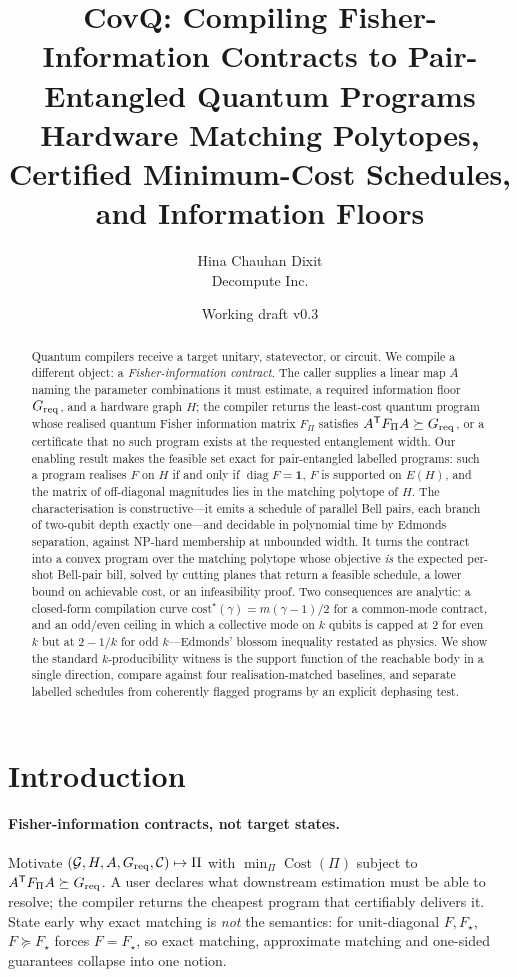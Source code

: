 \documentclass[11pt]{article}
\title{CovQ: Compiling Fisher-Information Contracts to Pair-Entangled Quantum
Programs\\\large Hardware Matching Polytopes, Certified Minimum-Cost Schedules, and
Information Floors}
\author{Hina Chauhan Dixit\\Decompute Inc.}
\date{Working draft v0.3}
\begin{document}
\maketitle

\begin{abstract}
Quantum compilers receive a target unitary, statevector, or circuit. We compile a different
object: a \emph{Fisher-information contract}. The caller supplies a linear map $A$ naming the
parameter combinations it must estimate, a required information floor $G_{\rm req}$, and a
hardware graph $H$; the compiler returns the least-cost quantum program whose realised quantum
Fisher information matrix $F_\Pi$ satisfies $A^{\mathsf T}F_\Pi A\succeq G_{\rm req}$, or a
certificate that no such program exists at the requested entanglement width. Our enabling
result makes the feasible set exact for pair-entangled labelled programs: such a program
realises $F$ on $H$ if and only if $\operatorname{diag}F=\bm1$, $F$ is supported on $E(H)$, and
the matrix of off-diagonal magnitudes lies in the matching polytope of $H$. The
characterisation is constructive---it emits a schedule of parallel Bell pairs, each branch of
two-qubit depth exactly one---and decidable in polynomial time by Edmonds separation, against
NP-hard membership at unbounded width. It turns the contract into a convex program over the
matching polytope whose objective \emph{is} the expected per-shot Bell-pair bill, solved by
cutting planes that return a feasible schedule, a lower bound on achievable cost, or an
infeasibility proof. Two consequences are analytic: a closed-form compilation curve
$\mathrm{cost}^\star(\gamma)=m(\gamma-1)/2$ for a common-mode contract, and an odd/even
ceiling in which a collective mode on $k$ qubits is capped at $2$ for even $k$ but at $2-1/k$
for odd $k$---Edmonds' blossom inequality restated as physics. We show the standard
$k$-producibility witness is the support function of the reachable body in a single direction,
compare against four realisation-matched baselines, and separate labelled schedules from
coherently flagged programs by an explicit dephasing test.
\end{abstract}

\section{Introduction}
\paragraph{Fisher-information contracts, not target states.}
Motivate $(\mathcal G,H,A,G_{\rm req},\mathcal C)\mapsto\Pi$ with
$\min_\Pi\operatorname{Cost}(\Pi)$ subject to $A^{\mathsf T}F_\Pi A\succeq G_{\rm req}$. A user
declares what downstream estimation must be able to resolve; the compiler returns the cheapest
program that certifiably delivers it. State early why exact matching is \emph{not} the
semantics: for unit-diagonal $F,F_\star$, $F\succeq F_\star$ forces $F=F_\star$, so exact
matching, approximate matching and one-sided guarantees collapse into one notion.
\end{document}
